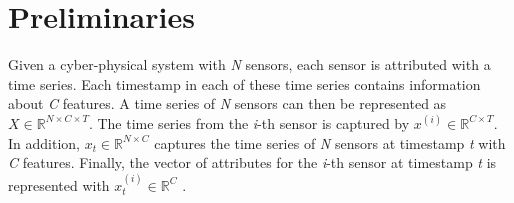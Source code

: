 \section{Preliminaries}
Given a cyber-physical system with \textit{N} sensors, each sensor is attributed with a time series.
Each timestamp in each of these time series contains information about \textit{C} features.
A time series of \textit{N} sensors can then be represented as \(X \in \mathbb{R}^{N \times C \times T}\).
The time series from the \textit{i}-th sensor is captured by \(x^{(i)} \in \mathbb{R}^{C \times T} \).
In addition, \(x_{t} \in \mathbb{R}^{N \times C}\) captures the time series of \textit{N} sensors at timestamp \textit{t} with \textit{C} features.
Finally, the vector of attributes for the \textit{i}-th sensor at timestamp \textit{t} is represented with \(x_{t}^{(i)} \in \mathbb{R}^{C}\) \cite{cirsteaEnhanceNetPluginNeural2021}.


